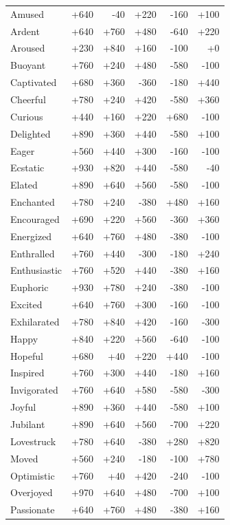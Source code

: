\begin{longtable}{@{}p{}rrrrr@{}}
Amused & +640 & -40 & +220 & -160 & +100 \\
Ardent & +640 & +760 & +480 & -640 & +220 \\
Aroused & +230 & +840 & +160 & -100 & +0 \\
Buoyant & +760 & +240 & +480 & -580 & -100 \\
Captivated & +680 & +360 & -360 & -180 & +440 \\
Cheerful & +780 & +240 & +420 & -580 & +360 \\
Curious & +440 & +160 & +220 & +680 & -100 \\
Delighted & +890 & +360 & +440 & -580 & +100 \\
Eager & +560 & +440 & +300 & -160 & -100 \\
Ecstatic & +930 & +820 & +440 & -580 & -40 \\
Elated & +890 & +640 & +560 & -580 & -100 \\
Enchanted & +780 & +240 & -380 & +480 & +160 \\
Encouraged & +690 & +220 & +560 & -360 & +360 \\
Energized & +640 & +760 & +480 & -380 & -100 \\
Enthralled & +760 & +440 & -300 & -180 & +240 \\
Enthusiastic & +760 & +520 & +440 & -380 & +160 \\
Euphoric & +930 & +780 & +240 & -380 & -100 \\
Excited & +640 & +760 & +300 & -160 & -100 \\
Exhilarated & +780 & +840 & +420 & -160 & -300 \\
Happy & +840 & +220 & +560 & -640 & -100 \\
Hopeful & +680 & +40 & +220 & +440 & -100 \\
Inspired & +760 & +300 & +440 & -180 & +160 \\
Invigorated & +760 & +640 & +580 & -580 & -300 \\
Joyful & +890 & +360 & +440 & -580 & +100 \\
Jubilant & +890 & +640 & +560 & -700 & +220 \\
Lovestruck & +780 & +640 & -380 & +280 & +820 \\
Moved & +560 & +240 & -180 & -100 & +780 \\
Optimistic & +760 & +40 & +420 & -240 & -100 \\
Overjoyed & +970 & +640 & +480 & -700 & +100 \\
Passionate & +640 & +760 & +480 & -380 & +160 \\

\end{longtable}
